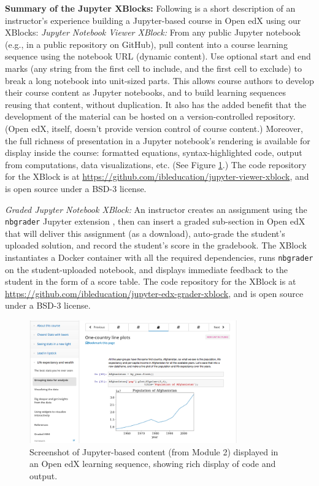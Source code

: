 \documentclass[10pt,journal,compsoc]{IEEEtran}
\begin{document}
\noindent \textbf{Summary of the Jupyter XBlocks:}
Following is a short description of an instructor's experience building a Jupyter-based course in Open edX using our XBlocks:
\emph{Jupyter Notebook Viewer XBlock:} From any public Jupyter notebook (e.g., in a public repository on GitHub), pull content into a course learning sequence using the notebook URL (dynamic content). 
Use optional start and end marks (any string from the first cell to include, and the first cell to exclude) to break a long notebook into unit-sized parts. 
This allows course authors to develop their course content as Jupyter notebooks, and to build learning sequences reusing that content, without duplication. 
It also has the added benefit that the development of the material can be hosted on a version-controlled repository. (Open edX, itself, doesn't provide version control of course content.)
Moreover, the full richness of presentation in a Jupyter notebook's rendering is available for display inside the course: formatted equations, syntax-highlighted code, output from computations, data visualizations, etc. (See Figure \ref{fig:openex}.)
The code repository for the XBlock is at \url{https://github.com/ibleducation/jupyter-viewer-xblock}, and is open source under a BSD-3 license.

\emph{Graded Jupyter Notebook XBlock:} An instructor creates an assignment using the \texttt{nbgrader} Jupyter extension \cite{hamrick2016,blank2019}, then can insert a graded sub-section in Open edX that will deliver this assignment (as a download), auto-grade the student's uploaded solution, and record the student's score in the gradebook. 
The XBlock instantiates a Docker container with all the required dependencies, runs \texttt{nbgrader} on the student-uploaded notebook, and displays immediate feedback to the student in the form of a score table. 
The code repository for the XBlock is at \url{https://github.com/ibleducation/jupyter-edx-grader-xblock}, and is open source under a BSD-3 license.

\begin{figure}
\begin{center}
\includegraphics[width=0.8\textwidth]{OpenEdXscreenshot.png}
\caption{Screenshot of Jupyter-based content (from Module 2) displayed in an Open edX learning sequence, showing rich display of code and output.\label{fig:openex}}
\end{center}
\end{figure}
\end{document}
